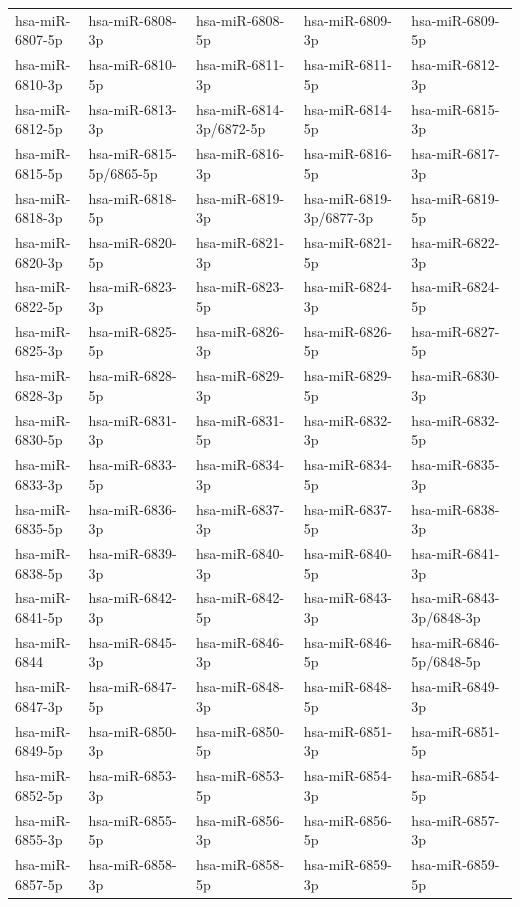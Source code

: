 \begin{longtable}{lllll}
hsa-miR-6807-5p & hsa-miR-6808-3p & hsa-miR-6808-5p & hsa-miR-6809-3p & hsa-miR-6809-5p \\
hsa-miR-6810-3p & hsa-miR-6810-5p & hsa-miR-6811-3p & hsa-miR-6811-5p & hsa-miR-6812-3p \\
hsa-miR-6812-5p & hsa-miR-6813-3p & hsa-miR-6814-3p/6872-5p & hsa-miR-6814-5p & hsa-miR-6815-3p \\
hsa-miR-6815-5p & hsa-miR-6815-5p/6865-5p & hsa-miR-6816-3p & hsa-miR-6816-5p & hsa-miR-6817-3p \\
hsa-miR-6818-3p & hsa-miR-6818-5p & hsa-miR-6819-3p & hsa-miR-6819-3p/6877-3p & hsa-miR-6819-5p \\
hsa-miR-6820-3p & hsa-miR-6820-5p & hsa-miR-6821-3p & hsa-miR-6821-5p & hsa-miR-6822-3p \\
hsa-miR-6822-5p & hsa-miR-6823-3p & hsa-miR-6823-5p & hsa-miR-6824-3p & hsa-miR-6824-5p \\
hsa-miR-6825-3p & hsa-miR-6825-5p & hsa-miR-6826-3p & hsa-miR-6826-5p & hsa-miR-6827-5p \\
hsa-miR-6828-3p & hsa-miR-6828-5p & hsa-miR-6829-3p & hsa-miR-6829-5p & hsa-miR-6830-3p \\
hsa-miR-6830-5p & hsa-miR-6831-3p & hsa-miR-6831-5p & hsa-miR-6832-3p & hsa-miR-6832-5p \\
hsa-miR-6833-3p & hsa-miR-6833-5p & hsa-miR-6834-3p & hsa-miR-6834-5p & hsa-miR-6835-3p \\
hsa-miR-6835-5p & hsa-miR-6836-3p & hsa-miR-6837-3p & hsa-miR-6837-5p & hsa-miR-6838-3p \\
hsa-miR-6838-5p & hsa-miR-6839-3p & hsa-miR-6840-3p & hsa-miR-6840-5p & hsa-miR-6841-3p \\
hsa-miR-6841-5p & hsa-miR-6842-3p & hsa-miR-6842-5p & hsa-miR-6843-3p & hsa-miR-6843-3p/6848-3p \\
hsa-miR-6844 & hsa-miR-6845-3p & hsa-miR-6846-3p & hsa-miR-6846-5p & hsa-miR-6846-5p/6848-5p \\
hsa-miR-6847-3p & hsa-miR-6847-5p & hsa-miR-6848-3p & hsa-miR-6848-5p & hsa-miR-6849-3p \\
hsa-miR-6849-5p & hsa-miR-6850-3p & hsa-miR-6850-5p & hsa-miR-6851-3p & hsa-miR-6851-5p \\
hsa-miR-6852-5p & hsa-miR-6853-3p & hsa-miR-6853-5p & hsa-miR-6854-3p & hsa-miR-6854-5p \\
hsa-miR-6855-3p & hsa-miR-6855-5p & hsa-miR-6856-3p & hsa-miR-6856-5p & hsa-miR-6857-3p \\
hsa-miR-6857-5p & hsa-miR-6858-3p & hsa-miR-6858-5p & hsa-miR-6859-3p & hsa-miR-6859-5p \\

\end{longtable}
